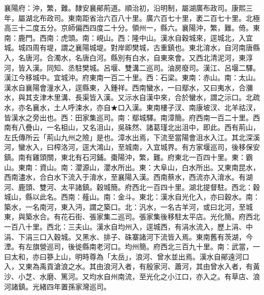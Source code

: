 \begin{pinyinscope}
襄陽府：沖，繁，難。隸安襄鄖荊道。順治初，沿明制，屬湖廣布政司。康熙三年，屬湖北布政司。東南距省治六百八十里。廣六百七十里，袤二百七十里。北極高三十二度五分。京師偏西四度二十分。領州一，縣六。襄陽沖，繁，難。倚。東南：鹿門。西南：虎頭。南：峴山。西：隆中山。漢水自穀城來，逕城北，入宜城。城四周有堤，謂之襄陽城堤。對岸即樊城，古重鎮也。東北淯水，自河南唐縣入，名唐河。合濁水，名唐白河。縣別有白水，自東來會。又西北清泥河，東淳河，皆入漢。同知、丞駐樊城。呂堰、雙溝二巡司。油房廢司。漢江、呂堰二驛。漢江今移城中。宜城沖。府東南一百二十里。西：石梁。東南：赤山。南：太山。漢水自襄陽會潼水入，逕縣東，入鍾祥。西南蠻水，一曰鄢水，又曰夷水，合瀰水，與其支津木里溝、長渠皆入漢。又沶水自漢中來，合於蠻水，謂之沶口。北疏水，亦名襄水，土人呼涑水，亦自★口入漢。東南樓子汊、南康坡汊、北羊祜汊，皆漢水之旁出也。西：田家集巡司。南：鄢城驛。南漳簡。府西南一百二十里。西南有八疊山，一名柤山，又名沮山，吳硃然、諸葛瑾北出沮中，即此。西有荊山，左氏傳所云「荊山九州之險」是也。漳水出焉，下流至當陽會沮水入江。其北深溪河，蠻水入，曰榨洛河，逕大鴻山，至城南，入宜城界。有方家堰巡司，後移保安鎮。南有雞頭關，東北有石河鋪。棗陽沖，繁，難。府東北一百四十里。東：霸山。東南：資山。南：瀴源山，瀴水所出。東：大阜山，白水所出。又東南昆水，西南濜水，合白水下流入于淯水，至襄陽入漢。西南蔡水，西流亦入淯水。有湖河、鹿頭、雙河、太平諸鎮。穀城簡。府西北一百四十里。湖北提督駐。西北：穀城山，縣以此名。西南：薤山。南：金斗。東北：漢水自光化入，亦曰穀水。南：築水，一名南河，東入沔，謂之築口。北：汎水，一名古羊河，或曰北河，至城東，與築水合。有花石街、張家集二巡司。張家集後移駐太平店。光化簡。府西北一百八十里。西北：三夫山。漢水自均州入，逕城西，有涓水流入，歷上涓、中涓、下涓三口入穀城。又黑水、排子、硃寨諸河下流皆入焉。東南舊有茨湖，今湮。有左旗營巡司，後徙縣南老河口。均州簡。府西北三百九十里。南：武當，一曰太和，亦曰篸上山，明時尊為「太岳」，浪河、曾水並出焉。漢水自鄖遠河口入，又東為禹貢滄浪之水。其由浪河入者，有殷家河、蕭河，其由曾水入者，有黃沙、小芝、水磨、篤河。又均水自州南流，至光化之小江口，亦入之。有草店、浪河諸鎮。光緒四年置孫家灣巡司。


\end{pinyinscope}
